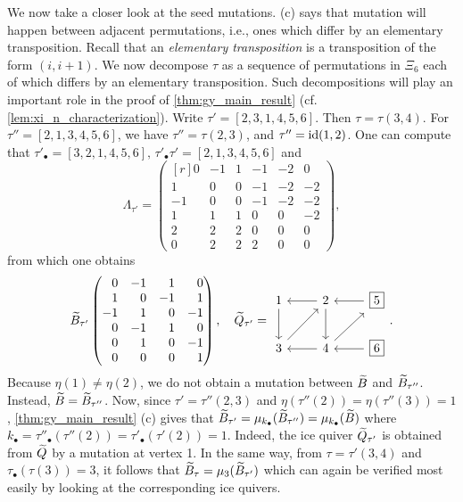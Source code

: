 \begin{example}
	We now take a closer look at the seed mutations.  (c) says
	that mutation will happen between adjacent permutations, i.e., ones which differ by an
	elementary transposition. Recall that an
	\emph{elementary transposition} is a transposition of the form $(i, i+1)$. We now
	decompose $\tau$ as a sequence of permutations in $\Xi_6$ each of which differs by an
	elementary transposition. Such decompositions will play an important role in the proof
	of \cref{thm:gy_main_result} (cf. \cref{lem:xi_n_characterization}). Write $\tau' =
		[2,3,1,4,5,6]$. Then $\tau = \tau(3,4)$. For $\tau'' = [2,1,3,4,5,6]$, we have $\tau''
		= \tau(2,3)$, and $\tau'' = \operatorname{id} (1,2)$. One can compute that $\tau'_{\bullet} =
			[3,2,1,4,5,6],\, \tau'_\bullet \tau' = [2,1,3,4,5,6]$ and
	\begin{equation*}
		\Lambda_{\tau'} = \begin{pmatrix*}[r]
			0 & -1 & 1 & -1 & -2 & 0\\
			1 & 0 & 0 & -1 & -2 & -2\\
			-1 & 0 & 0 & -1 & -2 & -2\\
			1 & 1 & 1 & 0 & 0 & -2\\
			2 & 2 & 2 & 0 & 0 & 0\\
			0 & 2 & 2 & 2 & 0 & 0
		\end{pmatrix*},
	\end{equation*}
	from which one obtains
	\begin{equation*}
		\tB_{\tau'}
		\begin{pmatrix*}[r]
			0 & -1 & 1 & 0\\
			1 & 0 & -1 & 1\\
			-1 & 1 & 0 & -1\\
			0 & -1 & 1 & 0\\
			0 & 1 & 0 & -1\\
			0 & 0 & 0 & 1
		\end{pmatrix*},
		\quad \tQ_{\tau'} =
		\begin{tikzcd}
			1 \dar & 2 \lar \dar & \boxed{5} \lar \\
			3 \urar & 4 \lar \urar & \boxed{6} \lar
		\end{tikzcd}
		.
	\end{equation*}
	Because $\eta(1) \neq \eta(2)$, we do not obtain a mutation between $\widetilde{B}$ and
	$\widetilde{B}_{\tau''}$. Instead, $\widetilde{B} = \widetilde{B}_{\tau''}$. Now, since $\tau' = \tau''(2,3)$ and
	$\eta(\tau''(2)) = \eta(\tau''(3)) = 1$, \cref{thm:gy_main_result} (c) gives that
	$\widetilde{B}_{\tau'} = \mu_{k_\bullet}(\widetilde{B}_{\tau''}) = \mu_{k_\bullet}(\widetilde{B})$ where $k_\bullet =
		\tau''_\bullet(\tau''(2)) = \tau'_\bullet(\tau'(2)) = 1$. Indeed, the ice quiver
	$\widetilde{Q}_{\tau'}$ is obtained from $\widetilde{Q}$ by a mutation at vertex 1. In the same way, from
	$\tau = \tau'(3,4)$ and $\tau_\bullet(\tau(3)) = 3$, it follows that $\widetilde{B}_\tau =
		\mu_{3}(\widetilde{B}_{\tau'})$ which can again be verified most easily by looking at the
	corresponding ice quivers.


\end{example}
